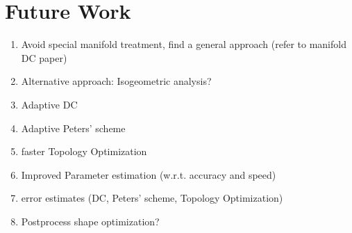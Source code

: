\section{Future Work}
\label{sec:Future}
\begin{enumerate}
\item Avoid special manifold treatment, find a general approach (refer to manifold DC paper)
\item Alternative approach: Isogeometric analysis?
\item Adaptive DC
\item Adaptive Peters' scheme
\item faster Topology Optimization
\item Improved Parameter estimation (w.r.t. accuracy and speed)
\item error estimates (DC, Peters' scheme, Topology Optimization)
\item Postprocess shape optimization?
\end{enumerate}
